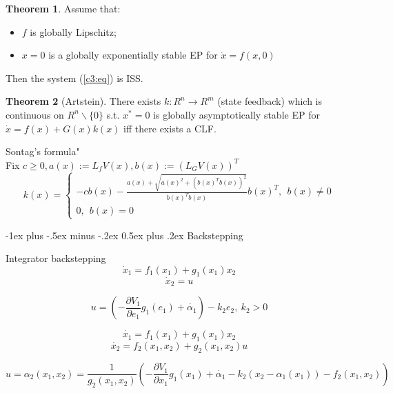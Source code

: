 \documentclass[10pt,landscape]{article}
\makeatletter
\theoremstyle{definition}
\newtheorem{Theorem}{Theorem}[section]
\renewcommand{\section}{\@startsection{section}{1}{0mm}%
                                {-1ex plus -.5ex minus -.2ex}%
                                {0.5ex plus .2ex}%
                                {\normalfont\large\bfseries}}
\makeatother
\begin{document}
\begin{multicols}{4}
\begin{Theorem}
 Assume that:
 \begin{itemize}
     \item $f$ is globally Lipschitz;
     \item $x = 0$ is a globally exponentially stable EP for $\dot x = f(x,0)$
 \end{itemize}
 Then the system (\ref{c3:eq}) is ISS.
\end{Theorem}

\begin{Theorem}[Artstein]
 There exists $k:R^n \to R^m$ (state feedback) which is continuous on $R^n \backslash \{ 0 \}$ s.t. $x^*=0$ is globally asymptotically stable EP for $\dot x = f(x)+G(x)k(x)$ iff there exists a CLF.
\end{Theorem}

Sontag's formula" \\
Fix $c \ge 0, a(x):=L_fV(x), b(x):=(L_GV(x))^T$
$$k(x) = \left\{
                \begin{array}{ll}
                  -cb(x)-\frac{a(x)+\sqrt{a(x)^2+(b(x)^Tb(x))^2}}{b(x)^Tb(x)}b(x)^T, \ \ b(x) \neq 0\\
                  0, \ \ b(x)=0
                \end{array}
              \right.$$

\section{Backstepping}

Integrator backstepping 
\begin{equation}\label{system_backstepping}
\dot x_1 = f_1(x_1) + g_1(x_1)x_2 
\end{equation}
\begin{equation*}
\dot x_2 = u
\end{equation*}

\begin{equation}\label{u_choice}
u = (- \frac{\partial V_1}{\partial e_1}g_1(e_1) + \dot{\alpha_1})- k_2e_2 , \ k_2 > 0
\end{equation}

\begin{equation*}
\dot{x_1} = f_1(x_1) + g_1(x_1)x_2
\end{equation*}
\begin{equation*}
\dot{x_2} = f_2(x_1, x_2) + g_2(x_1,x_2)u
\end{equation*}

\begin{equation*}
u = \alpha_2(x_1, x_2) = \frac{1}{g_2(x_1,x_2)}(-\frac{\partial V_1}{\partial x_1}g_1(x_1) + \dot{\alpha_1} - k_2(x_2 - \alpha_1(x_1)) - f_2(x_1, x_2))
\end{equation*} 


\end{multicols}
\end{document}
